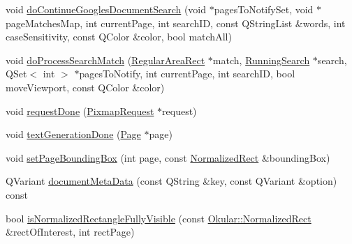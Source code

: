 \begin{DoxyCompactItemize}
\item 
void \hyperlink{classOkular_1_1DocumentPrivate_ab1004324d1cd74d10311e28dfb40c2fa}{do\+Continue\+Googles\+Document\+Search} (void $\ast$pages\+To\+Notify\+Set, void $\ast$page\+Matches\+Map, int current\+Page, int search\+I\+D, const Q\+String\+List \&words, int case\+Sensitivity, const Q\+Color \&color, bool match\+All)
\item 
void \hyperlink{classOkular_1_1DocumentPrivate_a71aa923afef1d2816fe26ffae544f7ce}{do\+Process\+Search\+Match} (\hyperlink{classOkular_1_1RegularAreaRect}{Regular\+Area\+Rect} $\ast$match, \hyperlink{structRunningSearch}{Running\+Search} $\ast$search, Q\+Set$<$ int $>$ $\ast$pages\+To\+Notify, int current\+Page, int search\+I\+D, bool move\+Viewport, const Q\+Color \&color)
\item 
void \hyperlink{classOkular_1_1DocumentPrivate_a26d26e6f52b4b6173ca55f264b855336}{request\+Done} (\hyperlink{classOkular_1_1PixmapRequest}{Pixmap\+Request} $\ast$request)
\item 
void \hyperlink{classOkular_1_1DocumentPrivate_a3d7b607de4146b9639564f7385ff5e86}{text\+Generation\+Done} (\hyperlink{classOkular_1_1Page}{Page} $\ast$page)
\item 
void \hyperlink{classOkular_1_1DocumentPrivate_afb6d3e039a27008d1c01cbd7e7c53251}{set\+Page\+Bounding\+Box} (int page, const \hyperlink{classOkular_1_1NormalizedRect}{Normalized\+Rect} \&bounding\+Box)
\item 
Q\+Variant \hyperlink{classOkular_1_1DocumentPrivate_a0e9f7fb7c06e95d62644eb693c6e2597}{document\+Meta\+Data} (const Q\+String \&key, const Q\+Variant \&option) const 
\item 
bool \hyperlink{classOkular_1_1DocumentPrivate_a6a3aff2f64cb37c3c1f50a778e43abfa}{is\+Normalized\+Rectangle\+Fully\+Visible} (const \hyperlink{classOkular_1_1NormalizedRect}{Okular\+::\+Normalized\+Rect} \&rect\+Of\+Interest, int rect\+Page)
\end{DoxyCompactItemize}
